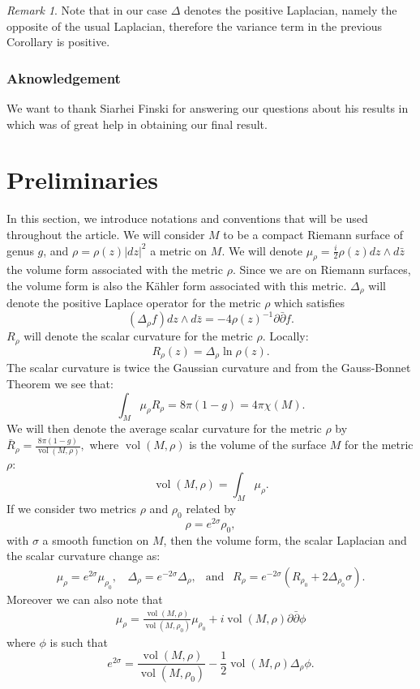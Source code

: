 \documentclass{article}
\theoremstyle{definition}
\theoremstyle{remark}
\newtheorem{Remark}[theorem]{Remark}
\DeclareMathOperator{\vol}{vol}
\begin{document}
\begin{Remark}
	Note that in our case $\Delta$ denotes the positive Laplacian, namely the opposite of the usual Laplacian, therefore the variance term in the previous Corollary is positive. 
\end{Remark}
\subsubsection*{Aknowledgement} We want to thank Siarhei Finski for answering our questions about his results in \cite{FINSKI20183457} which was of great help in obtaining our final result.


\section{Preliminaries}
In this section, we introduce notations and conventions that will be used throughout the article. We will consider $M$ to be a compact Riemann surface of genus $g$, and $\rho=\rho(z)|dz|^{2}$ a metric on $M$. We will denote $\mu_{\rho}=\frac{i}{2}\rho(z)d z \wedge d\bar{z}$ the volume form associated with the metric $\rho$. Since we are on Riemann surfaces, the volume form is also the Kähler form associated with this metric. $\Delta_{\rho}$ will denote the positive Laplace operator for the metric $\rho$ which satisfies $$(\Delta_{\rho} f)dz\wedge d\bar{z} =-4\rho(z)^{-1}\partial\bar\partial f.$$ $R_{\rho}$ will denote the scalar curvature for the metric $\rho$. 
Locally: $$R_{\rho}(z)=\Delta_{\rho} \ln\rho(z).$$ The scalar curvature is twice the Gaussian curvature and from the Gauss-Bonnet Theorem we see that: $$\int_{M}\mu_{\rho}R_{\rho}=8\pi(1-g)=4\pi\chi(M).$$ We will then denote the average scalar curvature for the metric $\rho$ by $\bar{R}_{\rho}=\frac{8\pi(1-g)}{\vol( M,\rho)},$ where $\vol(M,\rho)$ is the volume of the surface $M$ for the metric $\rho$: $$\vol(M,\rho)=\int_{M}\mu_{\rho}.$$ If we consider two metrics $\rho$ and $\rho_{0}$ related by \begin{equation}\label{MetriqueSigma}
    \rho=e^{2\sigma}\rho_{0},
\end{equation}
with $\sigma$ a smooth function on $M$, then the volume form, the scalar Laplacian and the scalar curvature change as: 
\begin{align*}
    \mu_{\rho}=e^{2\sigma}\mu_{\rho_{0}},~~~~
    \Delta_{\rho}=e^{-2\sigma}\Delta_{\rho},~~\text{ and }~~
    R_{\rho}=e^{-2\sigma}(R_{\rho_{0}}+2\Delta_{\rho_{0}}\sigma).
\end{align*}
Moreover we can also note that 
\begin{align}\label{MetriquePhi}
    \mu_{\rho}=\frac{\vol(M,\rho)}{\vol(M,\rho_{0})}\mu_{\rho_{0}}+i\vol(M,\rho)\partial \bar{\partial}\phi
\end{align}
where $\phi$ is such that \begin{equation}
    e^{2\sigma}=\frac{\vol(M,\rho)}{\vol(M,\rho_{0})}-\frac{1}{2}\vol(M,\rho)\Delta_{\rho}\phi.
\end{equation} 
\end{document}
